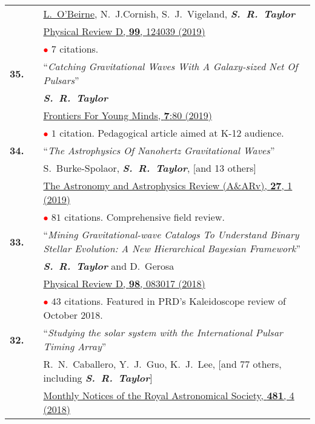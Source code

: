 \documentclass[11pt,letterpaper,sans]{moderncv}
\begin{document}
{\begin{longtable}{rp{0.3cm}p{15.8cm}}
&&\underline{L.~O'Beirne}, N.~J.Cornish, S.~J.~Vigeland, \textit{\textbf{S.~R.~Taylor}} \\
&& \href{https://journals.aps.org/prd/abstract/10.1103/PhysRevD.99.124039}{{\color{color1} Physical Review D, \textbf{99}, 124039 (2019)}} \\
&& \textcolor{red}{$\bullet$} $7$ citations. \vspace{0.09cm}\\
\textbf{35.} & & ``\textit{Catching Gravitational Waves With A Galaxy-sized Net Of Pulsars}'' \\ 
&&\textit{\textbf{S.~R.~Taylor}}\\
&& \href{https://kids.frontiersin.org/article/10.3389/frym.2019.00080}{{\color{color1} Frontiers For Young Minds, \textbf{7}:80 (2019)}} \\
&& \textcolor{red}{$\bullet$} $1$ citation. Pedagogical article aimed at K-12 audience. \vspace{0.09cm}\\
\textbf{34.} & & ``\textit{The Astrophysics Of Nanohertz Gravitational Waves}'' \\ 
&&S.~Burke-Spolaor, \textit{\textbf{S.~R.~Taylor}}, [and 13 others] \\
&& \href{https://arxiv.org/abs/1811.08826}{{\color{color1} The Astronomy and Astrophysics Review (A\&ARv), \textbf{27}, 1 (2019)}} \\
&& \textcolor{red}{$\bullet$} $81$ citations. Comprehensive field review. \vspace{0.09cm}\\
\textbf{33.} & & ``\textit{Mining Gravitational-wave Catalogs To Understand Binary Stellar Evolution: A New Hierarchical Bayesian Framework}'' \\ 
&&\textit{\textbf{S.~R.~Taylor}} and D.~Gerosa \\
&& \href{https://journals.aps.org/prd/abstract/10.1103/PhysRevD.98.083017}{{\color{color1} Physical Review D, \textbf{98}, 083017 (2018)}} \\
&& \textcolor{red}{$\bullet$} $43$ citations. Featured in PRD's Kaleidoscope review of October 2018. \vspace{0.09cm}\\
\textbf{32.} & & ``\textit{Studying the solar system with the International Pulsar Timing Array}'' \\ 
&&R.~N.~Caballero, Y.~J.~Guo, K.~J.~Lee, [and 77 others, including  \textit{\textbf{S.~R.~Taylor}}]\\
&& \href{https://academic.oup.com/mnras/article-abstract/481/4/5501/5113478?redirectedFrom=fulltext}{{\color{color1} Monthly Notices of the Royal Astronomical Society, \textbf{481}, 4 (2018)}}  \\

\end{longtable}}
\end{document}
